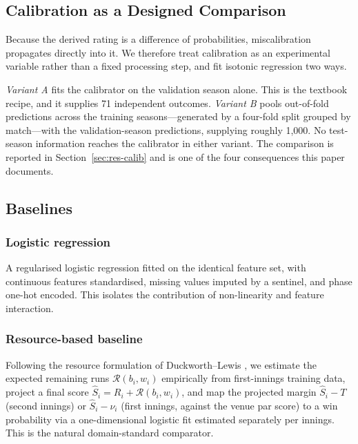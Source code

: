 \documentclass[conference]{IEEEtran}
\begin{document}
\subsection{Calibration as a Designed Comparison}
\label{sec:method-calib}

Because the derived rating is a difference of probabilities,
miscalibration propagates directly into it. We therefore treat
calibration as an experimental variable rather than a fixed processing
step, and fit isotonic regression \cite{niculescu2005} two ways.

\emph{Variant A} fits the calibrator on the validation season alone.
This is the textbook recipe, and it supplies 71 independent outcomes.
\emph{Variant B} pools out-of-fold predictions across the training
seasons---generated by a four-fold split grouped by match---with the
validation-season predictions, supplying roughly 1{,}000. No test-season
information reaches the calibrator in either variant. The comparison is
reported in Section~\ref{sec:res-calib} and is one of the four
consequences this paper documents.

\subsection{Baselines}

\subsubsection{Logistic regression}
A regularised logistic regression fitted on the identical feature set,
with continuous features standardised, missing values imputed by a
sentinel, and phase one-hot encoded. This isolates the contribution of
non-linearity and feature interaction.

\subsubsection{Resource-based baseline}
Following the resource formulation of Duckworth--Lewis
\cite{dl1998, stern2016}, we estimate the expected remaining runs
$\mathcal{R}(b_i, w_i)$ empirically from first-innings training data,
project a final score $\hat{S}_i = R_i + \mathcal{R}(b_i,w_i)$, and map
the projected margin $\hat{S}_i - T$ (second innings) or
$\hat{S}_i - \nu_i$ (first innings, against the venue par score) to a
win probability via a one-dimensional logistic fit estimated separately
per innings. This is the natural domain-standard comparator.
\end{document}
